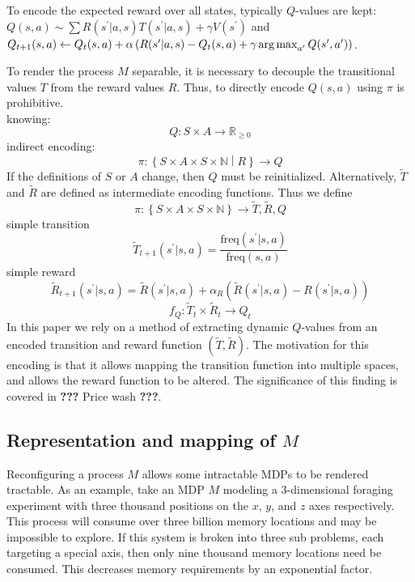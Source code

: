 To encode the expected reward over all states, typically $Q$-values are kept: $ Q(s,a) \sim \sum R(s^\prime|a,s)T(s^\prime|a,s)+\gamma V(s^\prime) $ and $ Q_{t+1}(s,a) \leftarrow Q_t(s,a)+\alpha \left( R(s^\prime|a,s)-Q_t(s,a)+\gamma\operatorname*{arg\,max}_{a^\prime} Q(s^\prime,a^\prime) \right) $.

To render the process $M$ separable, it is necessary to decouple the transitional values $T$ from the reward values $R$. Thus, to directly encode $Q(s,a)$ using $\pi$ is prohibitive.\\
knowing: 
\begin{equation*}
Q: S \times A \to \mathbb{R}_{\geq 0}
\end{equation*}
indirect encoding:
\begin{equation*}
\pi: \left\{ S \times A \times S \times \mathbb{N} \middle| R \right\} \to Q
\end{equation*}
If the definitions of $S$ or $A$ change, then $Q$ must be reinitialized. Alternatively, $\tilde{T}$ and $\tilde{R}$ are defined as intermediate encoding functions. Thus we define
\begin{equation*}
\pi:\left\{S \times A \times S \times \mathbb{N}\right\} \to \tilde{T}, \tilde{R}, Q
\end{equation*} 
simple transition
\begin{equation*}
\tilde{T}_{t+1}(s^\prime|s,a) = \frac{\textrm{freq}(s^\prime|s,a)}{\textrm{freq}(s,a)}
\end{equation*}
simple reward
\begin{equation*}
\tilde{R}_{t+1}(s^\prime|s,a) = \tilde{R}(s^\prime|s,a)+\alpha_R\left( \tilde{R}(s^\prime|s,a)-R(s^\prime|s,a)\right)
\end{equation*}
\begin{equation*}
f_Q: \tilde{T}_t \times \tilde{R}_t \to Q_t
\end{equation*}
In this paper we rely on a method of extracting dynamic $Q$-values from an encoded transition and reward function $( \tilde{T}, \tilde{R} )$. The motivation for this encoding is that it allows mapping the transition function into multiple spaces, and allows the reward function to be altered. The significance of this finding is covered in \textbf{???} Price wash \textbf{???}.

  
\subsection{Representation and mapping of $M$}

Reconfiguring a process $M$ allows some intractable MDPs to be rendered tractable. 
As an example, take an MDP $M$ modeling a 3-dimensional foraging experiment with three thousand positions on the $x$, $y$, and $z$
axes respectively. This process will consume over three billion memory locations and may be impossible to explore. If this system is
broken into three sub problems, each targeting a special axis, then only nine thousand memory locations need be consumed. This decreases memory requirements by an exponential factor.

